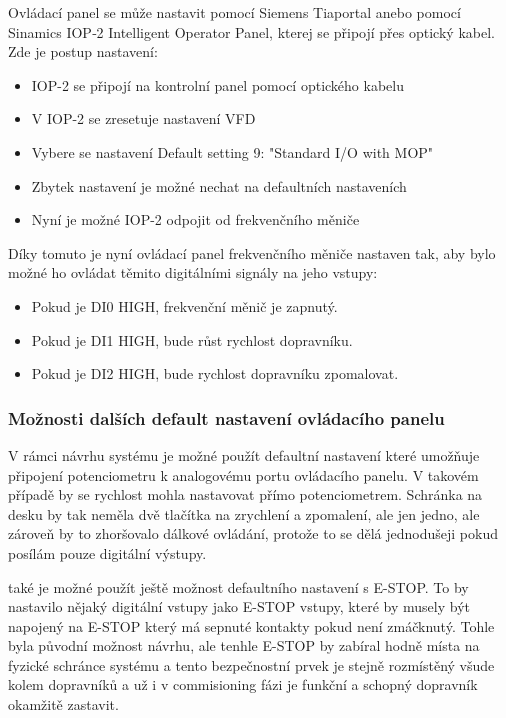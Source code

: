 Ovládací panel se může nastavit pomocí Siemens Tiaportal anebo pomocí Sinamics IOP‑2 Intelligent Operator Panel, kterej se připojí přes optický kabel. Zde je postup nastavení:\cite{SiemensG120DGettingStarted}
\begin{itemize}
    \item IOP-2 se připojí na kontrolní panel pomocí optického kabelu
    \item V IOP-2 se zresetuje nastavení VFD
    \item Vybere se nastavení Default setting 9: "Standard I/O with MOP" 
    \item Zbytek nastavení je možné nechat na defaultních nastaveních
    \item Nyní je možné IOP-2 odpojit od frekvenčního měniče
\end{itemize}

Díky tomuto je nyní ovládací panel frekvenčního měniče nastaven tak, aby bylo možné ho ovládat těmito digitálními signály na jeho vstupy:
\begin{itemize}
    \item Pokud je DI0 HIGH, frekvenční měnič je zapnutý.
    \item Pokud je DI1 HIGH, bude růst rychlost dopravníku.
    \item Pokud je DI2 HIGH, bude rychlost dopravníku zpomalovat.
\end{itemize}

\subsubsection{Možnosti dalších default nastavení ovládacího panelu}

V rámci návrhu systému je možné použít defaultní nastavení které umožňuje připojení potenciometru k analogovému portu ovládacího panelu. V takovém případě by se rychlost mohla nastavovat přímo potenciometrem. Schránka na desku by tak neměla dvě tlačítka na zrychlení a zpomalení, ale jen jedno, ale zároveň by to zhoršovalo dálkové ovládání, protože to se dělá jednodušeji pokud posílám pouze digitální výstupy.

také je možné použít ještě možnost defaultního nastavení s E-STOP. To by nastavilo nějaký digitální vstupy jako E-STOP vstupy, které by musely být napojený na E-STOP který má sepnuté kontakty pokud není zmáčknutý. Tohle byla původní možnost návrhu, ale tenhle E-STOP by zabíral hodně místa na fyzické schránce systému a tento bezpečnostní prvek je stejně rozmístěný všude kolem dopravníků a už i v commisioning fázi je funkční a schopný dopravník okamžitě zastavit.

